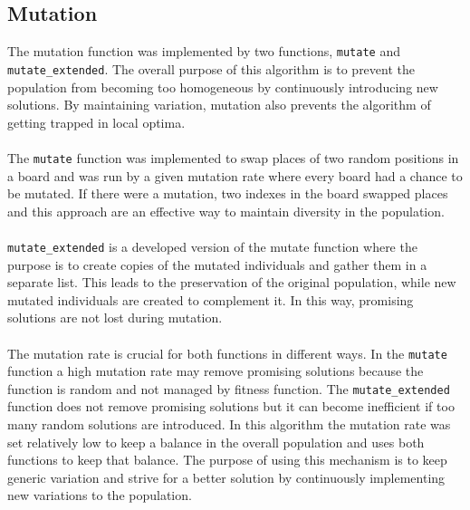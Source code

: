 \documentclass{scrartcl}
\begin{document}
\subsection*{Mutation} 
The mutation function was implemented by two functions, \texttt{mutate} and \texttt{mutate\_extended}. The overall purpose of this algorithm is to prevent the population from becoming too homogeneous by continuously introducing new solutions. By maintaining variation, mutation also prevents the algorithm of getting trapped in local optima. \\ \\ The \texttt{mutate} function was implemented to swap places of two random positions in a board and was run by a given mutation rate where every board had a chance to be mutated. If there were a mutation, two indexes in the board swapped places and this approach are an effective way to maintain diversity in the population. \\ \\\texttt{mutate\_extended} is a developed version of the mutate function where the purpose is to create copies of the mutated individuals and gather them in a separate list. This leads to the preservation of the original population, while new mutated individuals are created to complement it. In this way, promising solutions are not lost during mutation. \\ \\The mutation rate is crucial for both functions in different ways. In the \texttt{mutate} function a high mutation rate may remove promising solutions because the function is random and not managed by fitness function. The \texttt{mutate\_extended} function does not remove promising solutions but it can become inefficient if too many random solutions are introduced. In this algorithm the mutation rate was set relatively low to keep a balance in the overall population and uses both functions to keep that balance. The purpose of using this mechanism is to keep generic variation and strive for a better solution by continuously implementing new variations to the population.
\end{document}
